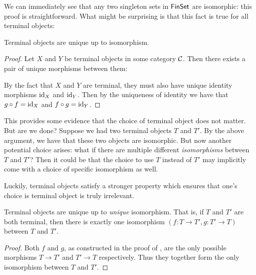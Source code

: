 We can immediately see that any two singleton sets in $\mathsf{FinSet}$ are isomorphic:
this proof is straightforward. What might be surprising is that this 
fact is true for all terminal objects:

\begin{theorem} \label{thm:terminal-object-unique}
  Terminal objects are unique up to isomorphism.
\end{theorem}
\begin{proof}
  Let $X$ and $Y$ be terminal objects in some category $\mathcal C$. 
  Then there exists a pair of unique morphisms between them:

  \begin{center}
\end{center}
By the fact that $X$ and $Y$ are terminal, they must also have unique identity
morphisms $\operatorname{id}_X$ and $\operatorname{id}_Y$. Then by the uniqueness of identity we have that $g \circ f = \operatorname{id}_X$ and $f \circ g = \operatorname{id}_Y$.
\end{proof}

This provides some evidence that the choice of terminal object does not matter.
  But are we done? Suppose we had two terminal objects \(T\) and \(T'\).
  By the above argument, we have that these two objects are isomorphic.
  But now another potential choice arises: what if there are multiple different
  \emph{isomorphisms} between \(T\) and \(T'\)?
  Then it could be that the choice to use \(T\) instead of \(T'\)
  may implicitly come with a choice of specific isomorphism as well.

  Luckily, terminal objects satisfy a stronger property
  which ensures that one's choice is terminal object is truly irrelevant.

\begin{proposition}
  Terminal objects are unique up to \emph{unique} isomorphism.
  That is, if \(T\) and \(T'\) are both terminal,
  then there is exactly one isomorphism
  \((f:T\to T',g:T'\to T)\)
  between \(T\) and \(T'\).
\end{proposition}
\begin{proof}
  Both \(f\) and \(g\), as constructed in the proof of
  ,
  are the only possible morphisms \(T \to T'\) and \(T'\to T\)
  respectively. Thus they together form the only isomorphism
  between \(T\) and \(T'\).
\end{proof}

